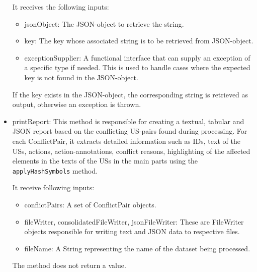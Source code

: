 \begin{itemize}
	It receives the following inputs:
	\begin{itemize}
		\item jsonObject: The JSON-object to retrieve the string.
		
		\item key: The key whose associated string is to be retrieved from JSON-object.
		
		\item exceptionSupplier: A functional interface that can supply an exception of a specific type if needed. This is used to handle cases where the expected key is not found in the JSON-object.
		
	\end{itemize}
	If the key exists in the JSON-object, the corresponding string is retrieved as output, otherwise an exception is thrown.
	
	\item printReport: This method is responsible for creating a textual, tabular and JSON report based on the conflicting US-pairs found during processing. For each ConflictPair, it extracts detailed information such as IDs, text of the USs, actions, action-annotations, conflict reasons, highlighting of the affected elements in the texts of the USs in the main parts using the \texttt{applyHashSymbols} method. 
	
	It receive following inputs: 
	\begin{itemize}
		\item conflictPairs: A set of ConflictPair objects.
		
		\item fileWriter, consolidatedFileWriter, jsonFileWriter: These are FileWriter objects responsible for writing text and JSON data to respective files.
		
		\item fileName: A String representing the name of the dataset being processed.
	\end{itemize}
	The method does not return a value.
	\end{itemize}
	

